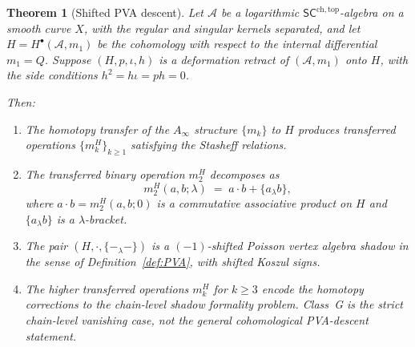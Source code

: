 \documentclass[11pt,reqno]{amsart}
\newtheorem{theorem}{Theorem}[section]
\theoremstyle{definition}
\theoremstyle{remark}
\newcommand{\cA}{\mathcal{A}}
\newcommand{\Ainf}{A_{\infty}}
\newcommand{\SCchtop}{\mathsf{SC}^{\mathrm{ch,top}}}
\numberwithin{equation}{section}
\begin{document}
\begin{theorem}[Shifted PVA descent]
\label{thm:pva-descent}
\ClaimStatusConditional{}
Let $\cA$ be a logarithmic $\SCchtop$-algebra on a smooth curve $X$,
with the regular and singular kernels separated, and let
$H = H^\bullet(\cA, m_1)$ be the cohomology with respect to
the internal differential $m_1 = Q$.  Suppose
$(H, p, \iota, h)$ is a deformation retract of $(\cA, m_1)$
onto $H$, with the side conditions $h^2 = h\iota = ph = 0$.

Then:
\begin{enumerate}[label=(\alph*)]
\item The homotopy transfer of the $\Ainf$ structure
  $\{m_k\}$ to $H$ produces transferred operations
  $\{m_k^H\}_{k \geq 1}$ satisfying the Stasheff relations.

\item The transferred binary operation $m_2^H$ decomposes as
  \[
    m_2^H(a,b;\lambda)
    \;=\;
    a \cdot b + \{a_\lambda b\},
  \]
  where $a \cdot b = m_2^H(a,b;0)$ is a commutative associative
  product on $H$ and $\{a_\lambda b\}$ is a $\lambda$-bracket.

\item The pair $(H, \cdot, \{-_\lambda -\})$ is a
  $(-1)$-shifted Poisson vertex algebra shadow in the sense of
  Definition~\textup{\ref{def:PVA}}, with shifted Koszul signs.

\item The higher transferred operations $m_k^H$ for $k \geq 3$
  encode the homotopy corrections to the chain-level shadow
  formality problem. Class~G is the strict chain-level vanishing
  case, not the general cohomological PVA-descent statement.
\end{enumerate}
\end{theorem}
\end{document}
